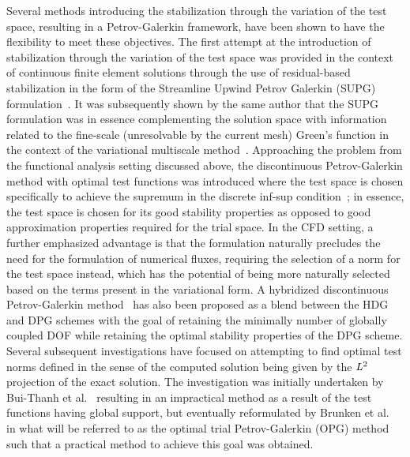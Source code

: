 Several methods introducing the
stabilization through the variation of the test space, resulting in a
Petrov-Galerkin framework, have been shown to have the flexibility to meet these
objectives.
The first attempt at the introduction of stabilization through the variation of
the test space was provided in the context of continuous finite element
solutions through the use of residual-based stabilization in the form of the
Streamline Upwind Petrov Galerkin (SUPG) formulation~\cite{Brooks1982}.
It was subsequently shown by the same author that the SUPG formulation was in
essence complementing the solution space with information related to the
fine-scale (unresolvable by the current mesh) Green's function in the context of
the variational multiscale method~\cite{Hughes1998,Hughes2007}.
Approaching the problem from the functional analysis setting discussed above,
the discontinuous Petrov-Galerkin method with optimal test functions was
introduced where the test space is chosen specifically to achieve the supremum
in the discrete inf-sup condition~\cite{Demkowicz2010,Demkowicz2017}; in
essence, the test space is chosen for its good stability properties as opposed
to good approximation properties required for the trial space.
In the CFD setting,
a further emphasized advantage is that the formulation naturally precludes the
need for the formulation of numerical fluxes, requiring the selection of a norm
for the test space instead, which has the potential of being more naturally
selected based on the terms present in the variational form.
A hybridized discontinuous Petrov-Galerkin method~\cite{Moro2012} has also been
proposed as a blend between the HDG and DPG schemes with the goal of retaining
the minimally number of globally coupled DOF while retaining the optimal
stability properties of the DPG scheme. Several subsequent investigations have
focused on attempting to find optimal test norms defined in the sense of the
computed solution being given by the $\mathit{{{L}}}^2$ projection of the exact
solution. The investigation was initially undertaken by Bui-Thanh et
al.~\cite{BuiThanh2013} resulting in an impractical method as a result of the
test functions having global support, but eventually reformulated by Brunken et
al.~\cite{Brunken2018} in what will be referred to as the optimal trial
Petrov-Galerkin (OPG) method such that a practical method to achieve this goal was
obtained.

